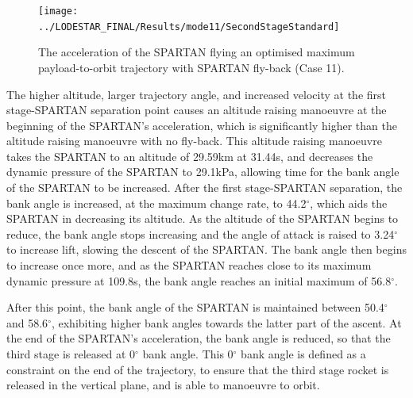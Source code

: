   \begin{figure}[!ht]
  	\centering
  	\texttt{[image: ../LODESTAR\_FINAL/Results/mode11/SecondStageStandard]}
  	\caption{The acceleration of the SPARTAN flying an optimised maximum payload-to-orbit trajectory with SPARTAN fly-back (Case 11). }
  	\label{fig:SecondStageStandard}
  \end{figure}
 The higher altitude, larger trajectory angle, and increased velocity at the first stage-SPARTAN separation point causes an altitude raising manoeuvre at the beginning of the SPARTAN's acceleration, which is significantly higher than the altitude raising manoeuvre with no fly-back. This altitude raising manoeuvre takes the SPARTAN to an altitude of 29.59km at 31.44s, and decreases the dynamic pressure of the SPARTAN to 29.1kPa, allowing time for the bank angle of the SPARTAN to be increased. 
 After the first stage-SPARTAN separation, the bank angle is increased, at the maximum change rate, to 44.2$^\circ$, which aids the SPARTAN in decreasing its altitude. As the altitude of the SPARTAN begins to reduce, the bank angle stops increasing and the angle of attack is raised to 3.24$^\circ$ to increase lift, slowing the descent of the SPARTAN. 
 The bank angle then begins to increase once more, and as the SPARTAN reaches close to its maximum dynamic pressure at 109.8s, the bank angle reaches an initial maximum of 56.8$^\circ$. 

After this point, the bank angle of the SPARTAN is maintained between 50.4$^\circ$ and 58.6$^\circ$, exhibiting higher bank angles towards the latter part of the ascent. At the end of the SPARTAN's acceleration, the bank angle is reduced, so that the third stage is released at 0$^\circ$ bank angle. This 0$^\circ$ bank angle is defined as a constraint on the end of the trajectory, to ensure that the third stage rocket is released in the vertical plane, and is able to manoeuvre to orbit. 


